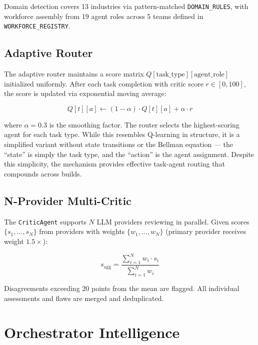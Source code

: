 \documentclass[11pt,a4paper]{article}
\begin{document}
Domain detection covers 13 industries via pattern-matched \texttt{DOMAIN\_RULES}, with workforce assembly from 19 agent roles across 5 teams defined in \texttt{WORKFORCE\_REGISTRY}.

\subsection{Adaptive Router}

The adaptive router maintains a score matrix $Q[\text{task\_type}][\text{agent\_role}]$ initialized uniformly. After each task completion with critic score $r \in [0, 100]$, the score is updated via exponential moving average:

\begin{equation}
Q[t][a] \leftarrow (1 - \alpha) \cdot Q[t][a] + \alpha \cdot r
\label{eq:router}
\end{equation}

where $\alpha = 0.3$ is the smoothing factor. The router selects the highest-scoring agent for each task type. While this resembles Q-learning in structure, it is a simplified variant without state transitions or the Bellman equation --- the ``state'' is simply the task type, and the ``action'' is the agent assignment. Despite this simplicity, the mechanism provides effective task-agent routing that compounds across builds.

\subsection{N-Provider Multi-Critic}

The \texttt{CriticAgent} supports $N$ LLM providers reviewing in parallel. Given scores $\{s_1, \ldots, s_N\}$ from providers with weights $\{w_1, \ldots, w_N\}$ (primary provider receives weight $1.5\times$):

\begin{equation}
s_{\text{agg}} = \frac{\sum_{i=1}^{N} w_i \cdot s_i}{\sum_{i=1}^{N} w_i}
\label{eq:critic}
\end{equation}

Disagreements exceeding 20 points from the mean are flagged. All individual assessments and flaws are merged and deduplicated.

\section{Orchestrator Intelligence}
\label{sec:orch_intelligence}
\end{document}
